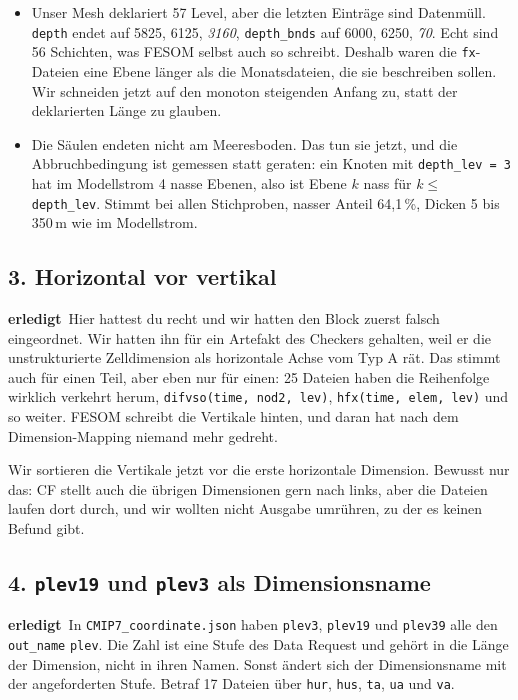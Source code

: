 \documentclass[11pt,a4paper]{article}
\newcommand{\code}[1]{\texttt{\small #1}}
\newcommand{\ok}{\textcolor{green!45!black}{\textbf{erledigt}}}
\begin{document}
\begin{itemize}
\item Unser Mesh deklariert 57 Level, aber die letzten Eintr\"age sind Datenm\"ull.
      \code{depth} endet auf 5825, 6125, \emph{3160}, \code{depth\_bnds} auf 6000,
      6250, \emph{70}. Echt sind 56 Schichten, was FESOM selbst auch so schreibt.
      Deshalb waren die \code{fx}-Dateien eine Ebene l\"anger als die
      Monatsdateien, die sie beschreiben sollen. Wir schneiden jetzt auf den
      monoton steigenden Anfang zu, statt der deklarierten L\"ange zu glauben.
\item Die S\"aulen endeten nicht am Meeresboden. Das tun sie jetzt, und die
      Abbruchbedingung ist gemessen statt geraten: ein Knoten mit
      \code{depth\_lev = 3} hat im Modellstrom 4 nasse Ebenen, also ist Ebene $k$
      nass f\"ur $k \le$ \code{depth\_lev}. Stimmt bei allen Stichproben, nasser
      Anteil 64{,}1\,\%, Dicken 5 bis 350\,m wie im Modellstrom.
\end{itemize}

\subsection*{3. Horizontal vor vertikal}
\ok\ Hier hattest du recht und wir hatten den Block zuerst falsch eingeordnet.
Wir hatten ihn f\"ur ein Artefakt des Checkers gehalten, weil er die
unstrukturierte Zelldimension als horizontale Achse vom Typ A r\"at. Das stimmt
auch f\"ur einen Teil, aber eben nur f\"ur einen: 25 Dateien haben die
Reihenfolge wirklich verkehrt herum, \code{difvso(time, nod2, lev)},
\code{hfx(time, elem, lev)} und so weiter. FESOM schreibt die Vertikale hinten,
und daran hat nach dem Dimension-Mapping niemand mehr gedreht.

Wir sortieren die Vertikale jetzt vor die erste horizontale Dimension. Bewusst
nur das: CF stellt auch die \"ubrigen Dimensionen gern nach links, aber die
Dateien laufen dort durch, und wir wollten nicht Ausgabe umr\"uhren, zu der es
keinen Befund gibt.

\subsection*{4. \code{plev19} und \code{plev3} als Dimensionsname}
\ok\ In \code{CMIP7\_coordinate.json} haben \code{plev3}, \code{plev19} und
\code{plev39} alle den \code{out\_name} \code{plev}. Die Zahl ist eine Stufe des
Data Request und geh\"ort in die L\"ange der Dimension, nicht in ihren Namen.
Sonst \"andert sich der Dimensionsname mit der angeforderten Stufe. Betraf 17
Dateien \"uber \code{hur}, \code{hus}, \code{ta}, \code{ua} und \code{va}.
\end{document}
